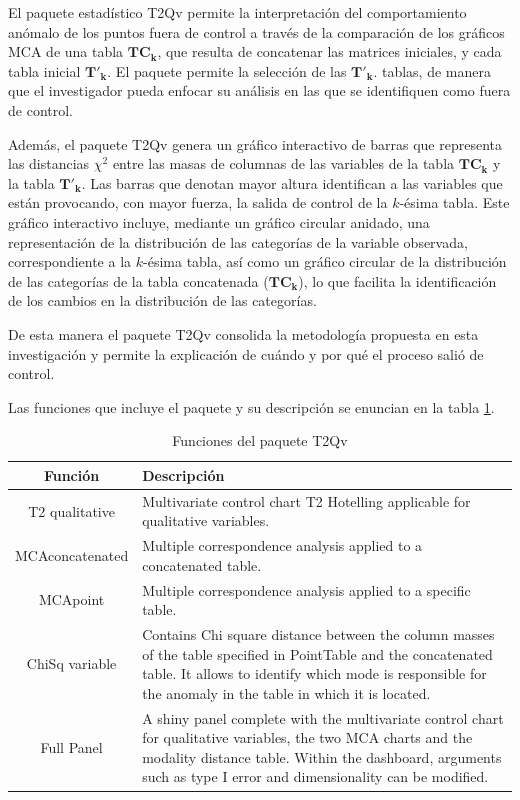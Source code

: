 \documentclass[mathematics,article,submit,moreauthors,pdftex]{mdpi}
\begin{document}
El paquete estadístico T2Qv permite la interpretación del comportamiento
anómalo de los puntos fuera de control a través de la comparación de los
gráficos MCA de una tabla \(\mathbf{TC_k}\), que resulta de concatenar
las matrices iniciales, y cada tabla inicial \(\mathbf{T'_k}\). El
paquete permite la selección de las \(\mathbf{T'_k}\). tablas, de manera
que el investigador pueda enfocar su análisis en las que se identifiquen
como fuera de control.

Además, el paquete T2Qv genera un gráfico interactivo de barras que
representa las distancias \(\chi^2\) entre las masas de columnas de las
variables de la tabla \(\mathbf{TC_k}\) y la tabla \(\mathbf{T'_k}\).
Las barras que denotan mayor altura identifican a las variables que
están provocando, con mayor fuerza, la salida de control de la
\(k\)-ésima tabla. Este gráfico interactivo incluye, mediante un gráfico
circular anidado, una representación de la distribución de las
categorías de la variable observada, correspondiente a la \(k\)-ésima
tabla, así como un gráfico circular de la distribución de las categorías
de la tabla concatenada (\(\mathbf{TC_k}\)), lo que facilita la
identificación de los cambios en la distribución de las categorías.

De esta manera el paquete T2Qv consolida la metodología propuesta en
esta investigación y permite la explicación de cuándo y por qué el
proceso salió de control.

Las funciones que incluye el paquete y su descripción se enuncian en la
tabla \ref{tab:functions}.

\begin{table}[h!]
\begin{center}
 \begin{tabular}{||c  m{35em}||} 
 \hline
  Función & Descripción \\ [0.5ex] 
 \hline\hline
 T2 qualitative & Multivariate control chart T2 Hotelling applicable for qualitative variables.\\
 \hline
  MCAconcatenated & Multiple correspondence analysis applied to a concatenated table.\\
\hline
  MCApoint & Multiple correspondence analysis applied to a specific table.\\
\hline
  ChiSq variable & Contains Chi square distance between the column masses of the table specified in PointTable and the concatenated table. It allows to identify which mode is responsible for the anomaly in the table in which it is located. \\ [1ex] 
  \hline
  Full Panel & A shiny panel complete with the 
  multivariate control chart for 
  qualitative variables, the two MCA 
  charts and the modality distance table. 
  Within the dashboard, arguments such as 
  type I error and dimensionality can be 
  modified. \\ [1ex] 
 \hline
\end{tabular}\caption{Funciones del paquete T2Qv}
\label{tab:functions}
\end{center}
\end{table}
\end{document}
